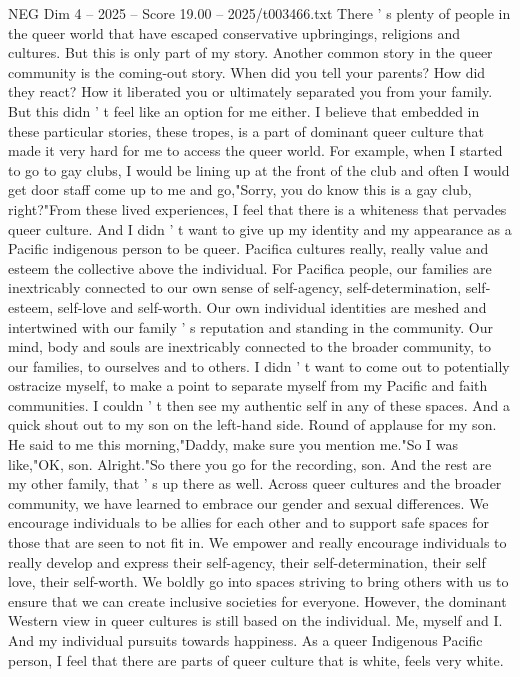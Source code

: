 \begin{textsample}{NEG Dim 4 – 2025 – Score 19.00 – 2025/t003466.txt}
There ' s plenty of people in the queer world that have escaped conservative upbringings, religions and cultures.
But this is only part of my story.
Another common story in the queer community is the coming-out story.
When did you tell your parents?
How did they react?
How it liberated you or ultimately separated you from your family.
But this didn ' t feel like an option for me either.
I believe that embedded in these particular stories, these tropes, is a part of dominant queer culture that made it very hard for me to access the queer world.
For example, when I started to go to gay clubs, I would be lining up at the front of the club and often I would get door staff come up to me and go,"Sorry, you do know this is a gay club, right?"From these lived experiences, I feel that there is a whiteness that pervades queer culture.
And I didn ' t want to give up my identity and my appearance as a Pacific indigenous person to be queer.
Pacifica cultures really, really value and esteem the collective above the individual.
For Pacifica people, our families are inextricably connected to our own sense of self-agency, self-determination, self-esteem, self-love and self-worth.
Our own individual identities are meshed and intertwined with our family ' s reputation and standing in the community.
Our mind, body and souls are inextricably connected to the broader community, to our families, to ourselves and to others.
I didn ' t want to come out to potentially ostracize myself, to make a point to separate myself from my Pacific and faith communities.
I couldn ' t then see my authentic self in any of these spaces.
And a quick shout out to my son on the left-hand side.
Round of applause for my son.
He said to me this morning,"Daddy, make sure you mention me."So I was like,"OK, son.
Alright."So there you go for the recording, son.
And the rest are my other family, that ' s up there as well.
Across queer cultures and the broader community, we have learned to embrace our gender and sexual differences.
We encourage individuals to be allies for each other and to support safe spaces for those that are seen to not fit in.
We empower and really encourage individuals to really develop and express their self-agency, their self-determination, their self love, their self-worth.
We boldly go into spaces striving to bring others with us to ensure that we can create inclusive societies for everyone.
However, the dominant Western view in queer cultures is still based on the individual.
Me, myself and I.
And my individual pursuits towards happiness.
As a queer Indigenous Pacific person, I feel that there are parts of queer culture that is white, feels very white.

\end{textsample}
